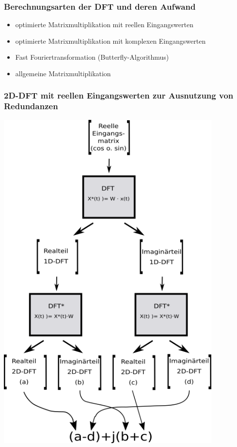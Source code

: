 \begin{frame}\frametitle{Berechnungsarten der DFT und deren Aufwand}
 \begin{itemize}
  \item optimierte Matrixmultiplikation mit reellen Eingangswerten
  \item optimierte Matrixmultiplikation mit komplexen Eingangswerten
  \item Fast Fouriertransformation (Butterfly-Algorithmus)
  \item allgemeine Matrixmultiplikation
 \end{itemize}
\end{frame}


\multipleframe
\begin{frame}\frametitle{2D-DFT mit reellen Eingangswerten zur Ausnutzung von Redundanzen}
\begin{minipage}{0.48\textwidth}
\begin{center}
 \includegraphics[width=0.85\textwidth]{img/reelleMatMult.png}
\end{center}
\end{minipage}
\hfill
\begin{minipage}{0.48\textwidth}
 
\end{minipage}
\end{frame}


